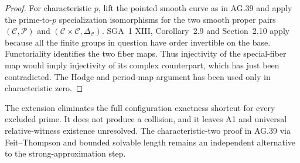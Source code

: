 \begin{proof}
For characteristic \(p\), lift the pointed smooth curve
as in AG.39 and apply the prime-to-\(p\) specialization
isomorphisms for the two smooth proper pairs
\((\mathcal C,\mathcal P)\) and
\((\mathcal C\times\mathcal C,\Delta_{\mathcal C})\).
SGA~1 XIII, Corollary~2.9 and Section~2.10 apply because
all the finite groups in question have order invertible
on the base. Functoriality identifies the two fiber maps.
Thus injectivity of the special-fiber map would imply
injectivity of its complex counterpart, which has just
been contradicted. The Hodge and period-map argument has
been used only in characteristic zero.
\end{proof}

The extension eliminates the full configuration exactness
shortcut for every excluded prime. It does not produce a
collision, and it leaves A1 and universal relative-witness
existence unresolved. The characteristic-two proof in AG.39
via Feit--Thompson and bounded solvable length remains an
independent alternative to the strong-approximation step.
